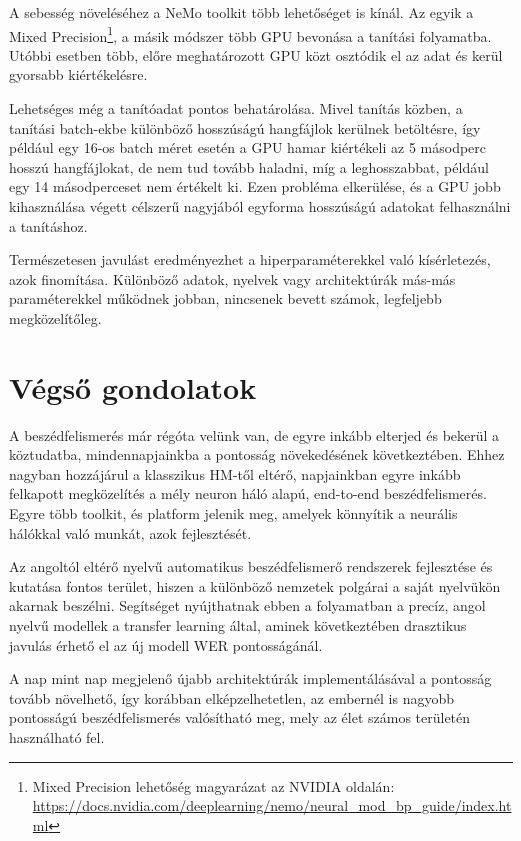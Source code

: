 A sebesség növeléséhez a NeMo toolkit több lehetőséget is kínál. Az egyik a Mixed Precision\footnote{Mixed Precision lehetőség magyarázat az NVIDIA oldalán: \url{https://docs.nvidia.com/deeplearning/nemo/neural_mod_bp_guide/index.html}}, a másik módszer több GPU bevonása a tanítási folyamatba. Utóbbi esetben több, előre meghatározott GPU közt osztódik el az adat és kerül gyorsabb kiértékelésre.

Lehetséges még a tanítóadat pontos behatárolása. Mivel tanítás közben, a tanítási batch-ekbe különböző hosszúságú hangfájlok kerülnek betöltésre, így például egy 16-os batch méret esetén a GPU hamar kiértékeli az 5 másodperc hosszú hangfájlokat, de nem tud tovább haladni, míg a leghosszabbat, például egy 14 másodperceset nem értékelt ki. Ezen probléma elkerülése, és a GPU jobb kihasználása végett célszerű nagyjából egyforma hosszúságú adatokat felhasználni a tanításhoz.

Természetesen javulást eredményezhet a hiperparaméterekkel való kísérletezés, azok finomítása. Különböző adatok, nyelvek vagy architektúrák más-más paraméterekkel működnek jobban, nincsenek bevett számok, legfeljebb megközelítőleg.

\section{Végső gondolatok}

A beszédfelismerés már régóta velünk van, de egyre inkább elterjed és bekerül a köztudatba, mindennapjainkba a pontosság növekedésének következtében. Ehhez nagyban hozzájárul a klasszikus HM-től eltérő, napjainkban egyre inkább felkapott megközelítés a mély neuron háló alapú, end-to-end beszédfelismerés. Egyre több toolkit, és platform jelenik meg, amelyek könnyítik a neurális hálókkal való munkát, azok fejlesztését.

Az angoltól eltérő nyelvű automatikus beszédfelismerő rendszerek fejlesztése és kutatása fontos terület, hiszen a különböző nemzetek polgárai a saját nyelvükön akarnak beszélni. Segítséget nyújthatnak ebben a folyamatban a precíz, angol nyelvű modellek a transfer learning által, aminek következtében drasztikus javulás érhető el az új modell WER pontosságánál.

A nap mint nap megjelenő újabb architektúrák implementálásával a pontosság tovább növelhető, így korábban elképzelhetetlen, az embernél is nagyobb pontosságú beszédfelismerés valósítható meg, mely az élet számos területén használható fel.